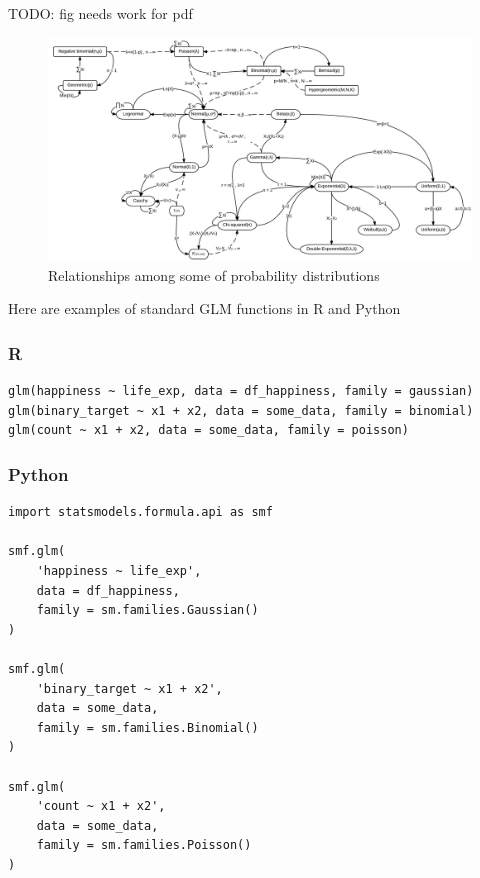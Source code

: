 \documentclass[
  letterpaper,
]{krantz}
\newcommand{\blandscape}{\begin{landscape}}
\newcommand{\elandscape}{\end{landscape}}
\begin{document}
TODO: fig needs work for pdf

\newpage

\blandscape

\begin{figure}

{\centering \includegraphics{img/distribution_relationships.jpg}

}

\caption{Relationships among some of probability distributions}

\end{figure}

\elandscape

\newpage

Here are examples of standard GLM functions in R and Python

\subsubsection{R}

\begin{verbatim}
glm(happiness ~ life_exp, data = df_happiness, family = gaussian)
glm(binary_target ~ x1 + x2, data = some_data, family = binomial)
glm(count ~ x1 + x2, data = some_data, family = poisson)
\end{verbatim}

\subsubsection{Python}

\begin{verbatim}
import statsmodels.formula.api as smf

smf.glm(
    'happiness ~ life_exp', 
    data = df_happiness, 
    family = sm.families.Gaussian()
)

smf.glm(
    'binary_target ~ x1 + x2', 
    data = some_data, 
    family = sm.families.Binomial()
)

smf.glm(
    'count ~ x1 + x2', 
    data = some_data, 
    family = sm.families.Poisson()
)
\end{verbatim}
\end{document}

